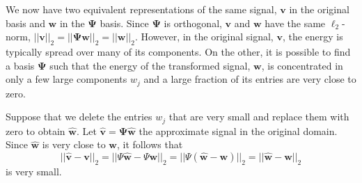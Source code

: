 We now have two equivalent representations of the same signal, $\bm v$ in the original basis and $\bm w$ in the $\bm\Psi$ basis.
Since $\bm\Psi$ is orthogonal, $\bm v$ and $\bm w$ have the same $\ell_2$-norm, $||\bm v||_2 = ||\bm\Psi\bm w||_2 = ||\bm w||_2$.
However, in the original signal, $\bm v$, the energy is typically spread over many of its components.
On the other, it is possible to find a basis $\bm\Psi$ such that the energy of the transformed signal, $\bm w$, is concentrated in only a few large components $w_j$ and a large fraction of its entries are very close to zero.

Suppose that we delete the entries $w_j$ that are very small and replace them with zero to obtain $\bm{\hat w}$.
Let $\bm{\hat v} = \bm\Psi\hat{\bm w}$ the approximate signal in the original domain.
Since $\bm{\hat w}$ is very close to $\bm w$, it follows that
\begin{equation*}
  ||\bm{\hat v} - \bm v||_2 = ||\Psi\bm{\hat w} - \Psi\bm w||_2 = ||\Psi (\bm{\hat w} - \bm w)||_2 = ||\bm{\hat w} - \bm w||_2
\end{equation*}
is very small.

